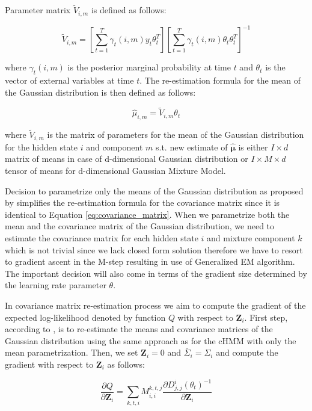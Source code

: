 Parameter matrix $\tilde{V}_{i,m}$ is defined as follows:

\begin{equation}
    \tilde{V}_{i,m} = \left[\sum\limits_{t=1}^{T} \gamma_{t}(i,m) y_t \theta_t^T\right] \left[ \sum\limits_{t=1}^{T} \gamma_{t}(i,m) \theta_t \theta_t^T \right]^{-1}
\end{equation}

where $\gamma_{t}(i,m)$ is the posterior marginal probability at time $t$ and $\theta_t$ is the vector of external variables at time $t$.
The re-estimation formula for the mean of the Gaussian distribution is then defined as follows:

\begin{equation}
    \hat{\mu}_{i,m} = \tilde{V}_{i,m} \theta_t
\end{equation}

where $\tilde{V}_{i,m}$ is the matrix of parameters for the mean of the Gaussian distribution for the hidden state $i$ and component $m$ s.t. 
new estimate of $\boldsymbol{\hat{\mu}}$ is either $I \times d$ matrix of means in case of d-dimensional Gaussian distribution or
$I \times M \times d$ tensor of means for d-dimensional Gaussian Mixture Model.

Decision to parametrize only the means of the Gaussian distribution as proposed by \citep{Bobick1999} simplifies the re-estimation formula for the covariance matrix 
since it is identical to Equation \ref{eq:covariance_matrix}. When we parametrize both the mean and the covariance matrix of the Gaussian distribution,
we need to estimate the covariance matrix for each hidden state $i$ and mixture component $k$ which is not trivial since 
we lack closed form solution therefore we have to resort to gradient ascent in the M-step resulting in use of Generalized EM algorithm. 
The important decision will also come in terms of the gradient size determined by the learning rate parameter $\theta$. \citep{Radenen2014}

In covariance matrix re-estimation process we aim to compute the gradient of the expected log-likelihood denoted by function $Q$ with respect to $\textbf{Z}_i$.
First step, according to \citep{Radenen2014}, is to re-estimate the means and covariance matrices of the Gaussian distribution using the same approach as for 
the cHMM with only the mean parametrization. Then, we set $\textbf{Z}_i = 0$ and $\bar{\Sigma}_i = \Sigma_i$ and compute the gradient with respect to $\textbf{Z}_i$ as follows:

\begin{equation}
    \frac{\partial Q}{\partial \textbf{Z}_i} = \sum_{k,t,i} M_{i,i}^{k,t,j} \frac{\partial D_{j,j}^i(\theta_t)^{-1}}{\partial \textbf{Z}_i}
\end{equation}

